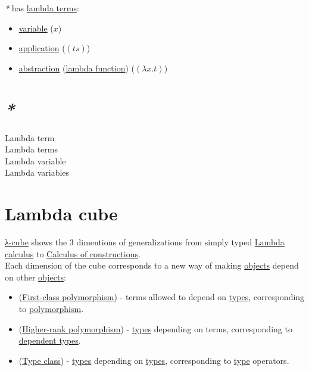 \documentclass[a4paper,14pt,oneside]{book}
\begin{document}
\emph{*} has \hyperref[orgb8092c4]{lambda terms}:\\
\begin{itemize}
\item \hyperref[org4af7747]{variable} (\(x\))\\
\item \hyperref[org1793e06]{application} (\((ts)\))\\
\item \hyperref[org8f8916c]{abstraction} (\hyperref[orgb9f8cf4]{lambda function}) (\((\lambda x . t)\))\\
\end{itemize}

\section{\emph{*}}
\label{sec:org3157356}

\label{org6adb64b}Lambda term\\
\label{orgb8092c4}Lambda terms\\
\label{org1cabd8b}Lambda variable\\
\label{org2f9ae68}Lambda variables\\

\section{\label{orgfef91a1}Lambda cube}
\label{sec:org8ae4b52}
\hyperref[orga5e0287]{λ-cube} shows the 3 dimentions of generalizations from simply typed \hyperref[org64d7489]{Lambda calculus} to \hyperref[orgf0b34ed]{Calculus of constructions}.\\

Each dimension of the cube corresponds to a new way of making \hyperref[orgc973d87]{objects} depend on other \hyperref[orgc973d87]{objects}:\\
\begin{itemize}
\item (\hyperref[org3e2fc1d]{First-class polymorphism}) - terms allowed to depend on \hyperref[org430d788]{types}, corresponding to \hyperref[org631694f]{polymorphism}.\\
\item (\hyperref[org81c14b9]{Higher-rank polymorphism}) - \hyperref[org430d788]{types} depending on terms, corresponding to \hyperref[org56de635]{dependent types}.\\
\item (\hyperref[org8e22081]{Type class}) - \hyperref[org430d788]{types} depending on \hyperref[org430d788]{types}, corresponding to \hyperref[orgdbcea73]{type} operators.\\
\end{itemize}
\end{document}
